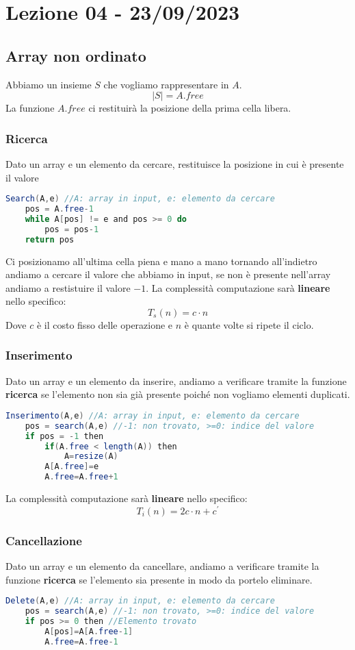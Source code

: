 \section{Lezione 04 - 23/09/2023}
\subsection{Array non ordinato}
Abbiamo un insieme $S$ che vogliamo rappresentare in $A$.\\
$$ |S| = A.free $$
La funzione $A.free$ ci restituirà la posizione della prima cella libera.\\


\subsubsection{Ricerca}
Dato un array e un elemento da cercare, restituisce la posizione in cui è presente il valore
\begin{lstlisting}[language=Java]
Search(A,e) //A: array in input, e: elemento da cercare
	pos = A.free-1
	while A[pos] != e and pos >= 0 do
		pos = pos-1
	return pos
\end{lstlisting}
Ci posizionamo all'ultima cella piena e mano a mano tornando all'indietro andiamo a cercare il valore che abbiamo in input, se non è presente nell'array andiamo a restistuire il valore $-1$. 
La complessità computazione sarà \textbf{lineare} nello specifico:
$$ T_s(n)=c \cdot n $$
Dove $c$ è il costo fisso delle operazione e $n$ è quante volte si ripete il ciclo.

\subsubsection{Inserimento}
Dato un array e un elemento da inserire, andiamo a verificare tramite la funzione \textbf{ricerca} se l'elemento non sia già presente poiché non vogliamo elementi duplicati.
\begin{lstlisting}[language=Java]
Inserimento(A,e) //A: array in input, e: elemento da cercare
	pos = search(A,e) //-1: non trovato, >=0: indice del valore
	if pos = -1 then
		if(A.free < length(A)) then
			A=resize(A)
		A[A.free]=e
		A.free=A.free+1
\end{lstlisting}
La complessità computazione sarà \textbf{lineare} nello specifico:
$$ T_i(n)=2c \cdot n + c^{\prime} $$
\newpage

\subsubsection{Cancellazione}
Dato un array e un elemento da cancellare, andiamo a verificare tramite la funzione \textbf{ricerca} se l'elemento sia presente in modo da portelo eliminare.
\begin{lstlisting}[language=Java]
Delete(A,e) //A: array in input, e: elemento da cercare
	pos = search(A,e) //-1: non trovato, >=0: indice del valore
	if pos >= 0 then //Elemento trovato
		A[pos]=A[A.free-1]
		A.free=A.free-1
\end{lstlisting}

